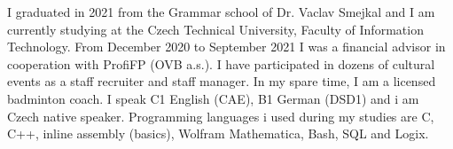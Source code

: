 \documentclass[9pt]{developercv} %
\begin{document}
\vspace{0.5cm}



\begin{minipage}[t]{0.4\textwidth} %
	\vspace{-\baselineskip} %
	
	I graduated in 2021 from the Grammar school of Dr. Vaclav Smejkal and I
	 am currently studying at the Czech Technical University, Faculty of Information
	  Technology. From December 2020 to September 2021 I was a financial advisor in
	   cooperation with ProfiFP (OVB a.s.). I have participated in dozens of
	    cultural events as a staff recruiter and staff manager. In my spare time,
		 I am a licensed badminton coach. I speak C1 English (CAE),
		  B1 German (DSD1) and i am Czech native speaker. Programming languages
		   i used during my studies are C, C++, inline assembly (basics),
		    Wolfram Mathematica, Bash, SQL and Logix.\\
\end{minipage}
\hfill %
\begin{minipage}[t]{0.5\textwidth} %
	\vspace{-\baselineskip} %
	\begin{barchart}{5.5}
	\end{barchart}
\end{minipage}

\begin{center}
\end{center}


\end{document}
